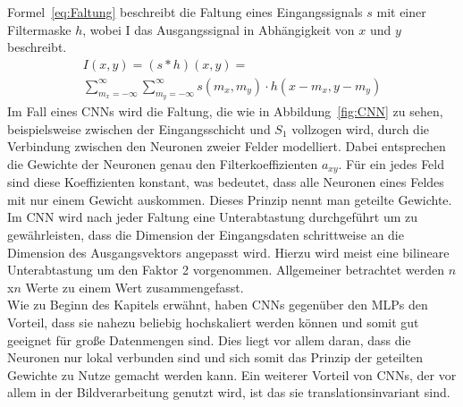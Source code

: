 \documentclass[times, 11pt,twocolumn]{article}
\begin{document}
\small  
Formel~\ref{eq:Faltung} beschreibt die Faltung eines Eingangssignals $s$ mit einer Filtermaske $h$, wobei I das Ausgangssignal in Abhängigkeit von $x$ und $y$ beschreibt.
\footnotesize
\begin{equation}
\begin{aligned}
I(x,y) = (s*h)(x,y) = \\
\sum_{m_x=-\infty}^\infty \sum_{m_y=-\infty}^\infty s(m_x,m_y) \cdot h(x-m_x,y-m_y) 
\end{aligned}
	\label{eq:Faltung}
\end{equation}
\small
Im Fall eines CNNs wird die Faltung, die wie in Abbildung~\ref{fig:CNN} zu sehen, beispielsweise zwischen der Eingangsschicht und $S_1$ vollzogen wird, durch die Verbindung zwischen den Neuronen zweier Felder modelliert. Dabei entsprechen die Gewichte der Neuronen genau den Filterkoeffizienten $a_{xy}$. Für ein jedes Feld sind diese Koeffizienten konstant, was bedeutet, dass alle Neuronen eines Feldes mit nur einem Gewicht auskommen. Dieses Prinzip nennt man geteilte Gewichte. \\
Im CNN wird nach jeder Faltung eine Unterabtastung durchgeführt um zu gewährleisten, dass die Dimension der Eingangsdaten schrittweise an die Dimension des Ausgangsvektors angepasst wird. Hierzu wird meist eine bilineare Unterabtastung um den Faktor 2 vorgenommen. Allgemeiner betrachtet werden $n$x$n$ Werte zu einem Wert zusammengefasst.\\
Wie zu Beginn des Kapitels erwähnt, haben CNNs gegenüber den MLPs den Vorteil, dass sie nahezu beliebig hochskaliert werden können und somit gut geeignet für große Datenmengen sind. Dies liegt vor allem daran, dass die Neuronen nur lokal verbunden sind und sich somit das Prinzip der geteilten Gewichte zu Nutze gemacht werden kann. Ein weiterer Vorteil von CNNs, der vor allem in der Bildverarbeitung genutzt wird, ist das sie translationsinvariant sind.
\end{document}
